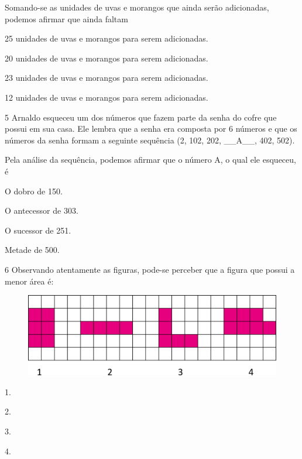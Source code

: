 Somando-se as unidades de uvas e morangos que ainda serão adicionadas, podemos afirmar que ainda faltam

\begin{escolha}
\item
  25 unidades de uvas e morangos para serem adicionadas.
\item
  20 unidades de uvas e morangos para serem adicionadas.
\item
  23 unidades de uvas e morangos para serem adicionadas.
\item
  12 unidades de uvas e morangos para serem adicionadas.
\end{escolha}


\num{5} Arnaldo esqueceu um dos números que fazem parte da senha do cofre que
possui em sua casa. Ele lembra que a senha era composta por 6 números e
que os números da senha formam a seguinte sequência (2, 102, 202,
\_\_A\_\_, 402, 502).

Pela análise da sequência, podemos afirmar que o número A, o qual ele esqueceu, é

\begin{multicols}{2}
\begin{escolha}
\item
  O dobro de 150.
\item
  O antecessor de 303.
\item
  O sucessor de 251.
\item
  Metade de 500.
\end{escolha}
\end{multicols}

\pagebreak
\num{6} Observando atentamente as figuras, pode-se perceber que a figura que possui a menor área é:

\begin{figure}[htpb!]
\centering
\includegraphics[width=\textwidth]{./media/image115.png}
\end{figure}

\begin{escolha}
\item
  1.
\item
  2.
\item
  3.
\item
  4.
\end{escolha}


